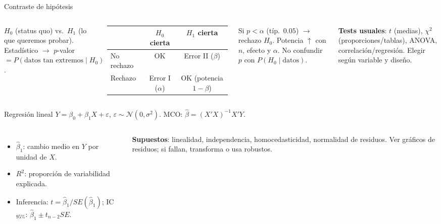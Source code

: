 \documentclass[aspectratio=169,8pt]{beamer}
\begin{document}
\begin{frame}{Contraste de hip\'otesis}
  \small
  \begin{columns}[T,onlytextwidth]
      $H_0$ (status quo) vs.\ $H_1$ (lo que queremos probar). Estad\'istico $\to$ $p$-valor $=P(\text{datos tan extremos}\mid H_0)$.\\[4pt]
      \begin{tabular}{@{}lcc@{}}
        \toprule
        & $H_0$ cierta & $H_1$ cierta\\
        \midrule
        No rechazo & OK & Error II ($\beta$)\\
        Rechazo & Error I ($\alpha$) & OK (potencia $1-\beta$)\\
        \bottomrule
      \end{tabular}
      \begin{tcolorbox}[formulabox,title=Decisi\'on]
        \footnotesize Si $p<\alpha$ (t\'ip.\ $0.05$) $\to$ rechazo $H_0$. Potencia $\uparrow$ con $n$, efecto y $\alpha$. No confundir $p$ con $P(H_0\mid\text{datos})$.
      \end{tcolorbox}
      \begin{tcolorbox}[tealbox]
        \scriptsize\raggedright\textbf{Tests usuales}: $t$ (medias), $\chi^2$ (proporciones/tablas), ANOVA, correlaci\'on/regresi\'on. Elegir seg\'un variable y dise\~no.\par
      \end{tcolorbox}
    \end{columns}
\end{frame}

\begin{frame}{Regresi\'on lineal}
  \small $Y = \beta_0 + \beta_1 X + \varepsilon$, $\varepsilon\sim\mathcal N(0,\sigma^2)$. MCO: $\hat\beta=(X'X)^{-1}X'Y$.
  \vspace{0.3em}
  \begin{columns}[T,onlytextwidth]
      \begin{itemize}
        \item $\hat\beta_1$: cambio medio en $Y$ por unidad de $X$.
        \item $R^2$: proporci\'on de variabilidad explicada.
        \item Inferencia: $t=\hat\beta_1/SE(\hat\beta_1)$; IC$_{95\%}$: $\hat\beta_1\pm t_{n-2}SE$.
      \end{itemize}
      \begin{tcolorbox}[amberbox]
        \scriptsize\textbf{Supuestos}: linealidad, independencia, homocedasticidad, normalidad de residuos. Ver gr\'aficos de residuos; si fallan, transforma o usa robustos.
      \end{tcolorbox}
    \end{columns}
\end{frame}
\end{document}
